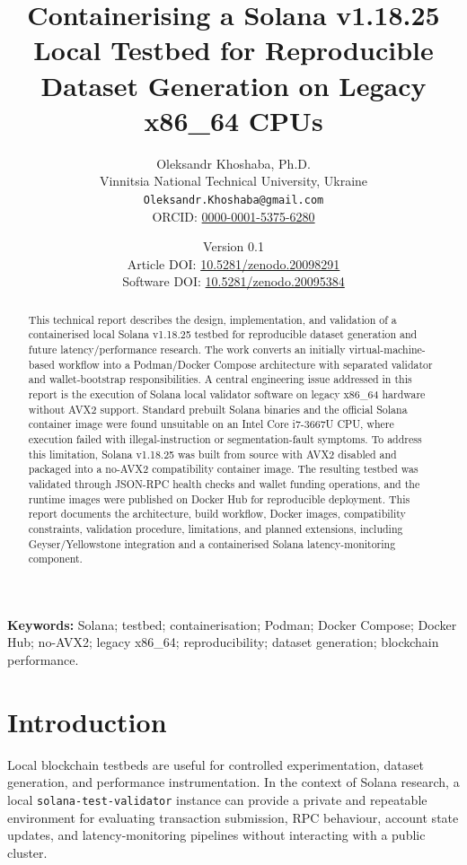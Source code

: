 \documentclass[11pt,a4paper]{article}
\title{
  \textbf{Containerising a Solana v1.18.25 Local Testbed for Reproducible Dataset Generation on Legacy x86\_64 CPUs}
}
\author{
  Oleksandr Khoshaba, Ph.D.\\
  Vinnitsia National Technical University, Ukraine\\
  \texttt{Oleksandr.Khoshaba@gmail.com}\\
  ORCID: \href{https://orcid.org/T0000-0001-5375-628}{0000-0001-5375-6280}
}
\date{
  Version 0.1\\
  Article DOI: \href{https://doi.org/10.5281/zenodo.20098291}{10.5281/zenodo.20098291}\\
  Software DOI: \href{https://doi.org/10.5281/zenodo.20095384}{10.5281/zenodo.20095384}
}
\begin{document}
\maketitle

\begin{abstract}
This technical report describes the design, implementation, and validation of a containerised local Solana v1.18.25 testbed for reproducible dataset generation and future latency/performance research. The work converts an initially virtual-machine-based workflow into a Podman/Docker Compose architecture with separated validator and wallet-bootstrap responsibilities. A central engineering issue addressed in this report is the execution of Solana local validator software on legacy x86\_64 hardware without AVX2 support. Standard prebuilt Solana binaries and the official Solana container image were found unsuitable on an Intel Core i7-3667U CPU, where execution failed with illegal-instruction or segmentation-fault symptoms. To address this limitation, Solana v1.18.25 was built from source with AVX2 disabled and packaged into a no-AVX2 compatibility container image. The resulting testbed was validated through JSON-RPC health checks and wallet funding operations, and the runtime images were published on Docker Hub for reproducible deployment. This report documents the architecture, build workflow, Docker images, compatibility constraints, validation procedure, limitations, and planned extensions, including Geyser/Yellowstone integration and a containerised Solana latency-monitoring component.
\end{abstract}

\noindent\textbf{Keywords:}
Solana; testbed; containerisation; Podman; Docker Compose; Docker Hub; no-AVX2; legacy x86\_64; reproducibility; dataset generation; blockchain performance.

\tableofcontents
\newpage

\section{Introduction}

Local blockchain testbeds are useful for controlled experimentation, dataset generation, and performance instrumentation. In the context of Solana research, a local \texttt{solana-test-validator} instance can provide a private and repeatable environment for evaluating transaction submission, RPC behaviour, account state updates, and latency-monitoring pipelines without interacting with a public cluster.
\end{document}
